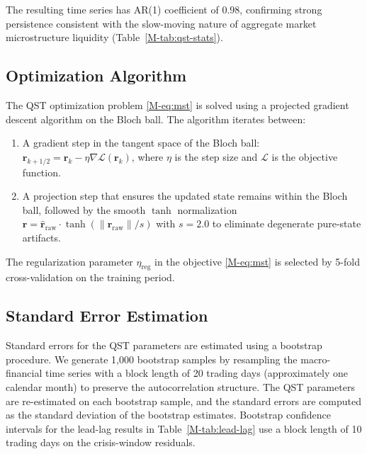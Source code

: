 The resulting time series has AR(1) coefficient of $0.98$, confirming strong
persistence consistent with the slow-moving nature of aggregate market
microstructure liquidity (Table~\ref{M-tab:qst-stats}).

\subsection{Optimization Algorithm}\label{sec:optimization}

The QST optimization problem \eqref{M-eq:mst} is solved using a projected gradient
descent algorithm on the Bloch ball. The algorithm iterates between:
\begin{enumerate}
    \item[(1)] A gradient step in the tangent space of the Bloch ball:
        $\mathbf{r}_{k+1/2} = \mathbf{r}_k - \eta \nabla \mathcal{L}(\mathbf{r}_k)$,
        where $\eta$ is the step size and $\mathcal{L}$ is the objective
        function.
    \item[(2)] A projection step that ensures the updated state remains within
        the Bloch ball, followed by the smooth $\tanh$ normalization
        $\mathbf{r} = \hat{\mathbf{r}}_{\mathrm{raw}}
        \cdot \tanh(\|\mathbf{r}_{\mathrm{raw}}\|/s)$ with $s = 2.0$ to
        eliminate degenerate pure-state artifacts.
\end{enumerate}
The regularization parameter $\eta_{\mathrm{reg}}$ in the objective
\eqref{M-eq:mst} is selected by 5-fold cross-validation on the training period.

\subsection{Standard Error Estimation}\label{sec:standard-errors}

Standard errors for the QST parameters are estimated using a bootstrap
procedure. We generate 1{,}000 bootstrap samples by resampling the
macro-financial time series with a block length of 20 trading days
(approximately one calendar month) to preserve the autocorrelation structure.
The QST parameters are re-estimated on each bootstrap sample, and the
standard errors are computed as the standard deviation of the bootstrap
estimates. Bootstrap confidence intervals for the lead-lag results in
Table~\ref{M-tab:lead-lag} use a block length of 10 trading days on the
crisis-window residuals.
